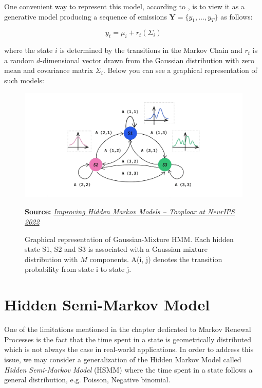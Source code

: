 One convenient way to represent this model, according to \citep{Yu2015}, is to view it as a generative model producing a sequence of emissions $\textbf{Y} = \{y_1,\ldots,y_T\}$ as follows:

\begin{equation}
    y_t = \mu_{i} + r_t(\Sigma_{i})
\end{equation}

where the state $i$ is determined by the transitions in the Markov Chain and $r_t$ is a random $d$-dimensional vector drawn from the Gaussian distribution with zero mean and covariance matrix $\Sigma_{i}$.
Below you can see a graphical representation of such models:

\begin{figure}[htbp]
    \begin{center}
        \includegraphics[width=1.0\textwidth]{Figs/gaussian_hmm.png}
        \caption*{\textbf{Source:} \href{https://tooploox.com/improving-hidden-markov-models-tooploox-at-neurips-2022s}{\textit{Improving Hidden Markov Models – Tooploox at NeurIPS 2022}}}
        \caption[Diagram of Gaussian Hidden Markov Model representation]{Graphical representation of Gaussian-Mixture HMM. Each hidden state S1, S2 and S3 is associated with a Gaussian mixture distribution with $M$ components. A(i, j) denotes the transition probability from state i to state j.}
        \label{fig:guaussian_hmm}
    \end{center}
\end{figure}

\section{Hidden Semi-Markov Model}

One of the limitations mentioned in the chapter dedicated to Markov Renewal Processes is the fact that the time spent in a state is geometrically distributed which is not
always the case in real-world applications. In order to address this issue, we may consider a generalization of the Hidden Markov Model called \textit{Hidden Semi-Markov Model} (HSMM) where
the time spent in a state follows a general distribution, e.g. Poisson, Negative binomial. \citep{Yu2015}

